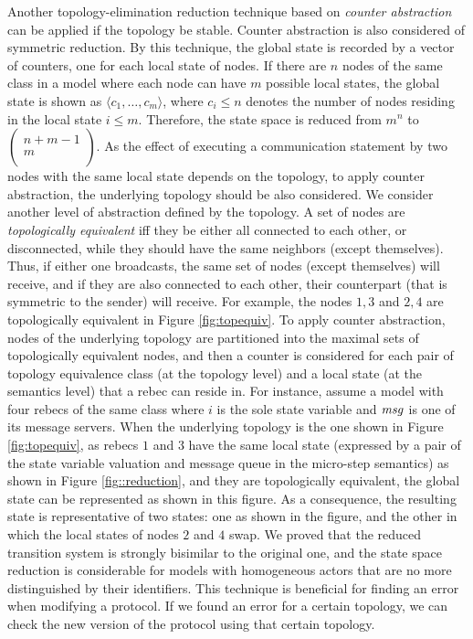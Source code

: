 Another topology-elimination reduction technique based on \emph{counter abstraction} can be applied \cite{emerson1999asymmetry} if the topology be stable. %
Counter abstraction is also considered of symmetric reduction. By this technique, the global state is recorded by a vector of counters, one for each local state of nodes. If there are $n$ nodes of the same class in a model where each node can have $m$ possible local states, the global state is shown as $\langle c_1,\ldots,c_m \rangle $, where $c_i\le n$ denotes the number of nodes residing in the local state $i\le m$. Therefore, the state space is reduced from $m^n$ to $\begin{pmatrix}
n+m-1 \\
m \\
\end{pmatrix}$. As the effect of executing a communication statement by two nodes with the same local state depends on the topology, to apply
counter abstraction, the underlying topology should be also considered. We consider another level of abstraction defined by the topology. A set of nodes are \textit{topologically equivalent} iff they be either all connected to each other, or disconnected, while they should have the same neighbors (except themselves). Thus, if either one broadcasts, the same set of nodes (except themselves) will receive, and if they are also connected to each other, their counterpart (that is symmetric to the sender) will receive. For example, the nodes $1,3$ and $2,4$ are topologically equivalent in Figure \ref{fig:topequiv}. To apply counter abstraction, %
nodes of the underlying topology are partitioned into the maximal sets of topologically equivalent nodes, and then a counter is considered for each pair of topology equivalence class (at the topology level) and a local state (at the semantics level) that a rebec can reside in. For instance, assume a model with four rebecs of the same class where $i$ is the sole state variable and ${\it msg}$ is one of its message servers. When the underlying topology is the one shown in Figure \ref{fig:topequiv}, as rebecs $1$ and $3$ have the same local state (expressed by a pair of the state variable valuation and message queue in the micro-step semantics) as shown in Figure \ref{fig::reduction}, and they are topologically equivalent, the global state can be represented as shown in this figure. As a consequence, the resulting state is representative of two states: one as shown in the figure, and the other in which the local states of nodes $2$ and $4$ swap. We proved that the reduced transition system is strongly bisimilar to
the original one, and the state space reduction is considerable for models with homogeneous  actors that are no more distinguished by their identifiers. This technique is
beneficial for finding an error when modifying a protocol. If we found an error for a certain topology, %
we can check the new version of the protocol using that certain topology.

